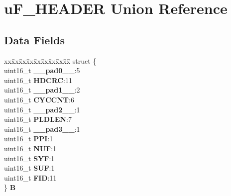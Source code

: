 \hypertarget{unionuF__HEADER}{}\section{u\+F\+\_\+\+H\+E\+A\+D\+ER Union Reference}
\label{unionuF__HEADER}
\subsection*{Data Fields}
\begin{DoxyCompactItemize}
\item 
\mbox{\label{unionuF__HEADER_a43d337f6f778d88bbc4935b6718155cd}} 
\begin{tabbing}
xx\=xx\=xx\=xx\=xx\=xx\=xx\=xx\=xx\=\kill
struct \{\\
\>uint16\_t {\bfseries \_\_pad0\_\_}:5\\
\>uint16\_t {\bfseries HDCRC}:11\\
\>uint16\_t {\bfseries \_\_pad1\_\_}:2\\
\>uint16\_t {\bfseries CYCCNT}:6\\
\>uint16\_t {\bfseries \_\_pad2\_\_}:1\\
\>uint16\_t {\bfseries PLDLEN}:7\\
\>uint16\_t {\bfseries \_\_pad3\_\_}:1\\
\>uint16\_t {\bfseries PPI}:1\\
\>uint16\_t {\bfseries NUF}:1\\
\>uint16\_t {\bfseries SYF}:1\\
\>uint16\_t {\bfseries SUF}:1\\
\>uint16\_t {\bfseries FID}:11\\
\} {\bfseries B}\\


\end{tabbing}
\end{DoxyCompactItemize}

